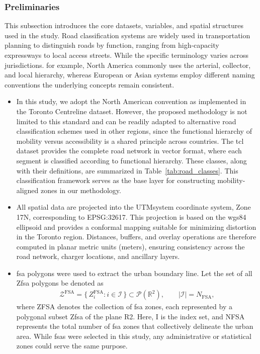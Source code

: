\subsubsection{Preliminaries}
This subsection introduces the core datasets, variables, and spatial structures
used in the study. Road classification systems are widely used in transportation planning to
distinguish roads by function, ranging from high-capacity expressways to
local access streets. While the specific terminology varies across
jurisdictions. for example, North America commonly uses the arterial, collector, and local hierarchy, whereas European or Asian systems employ different naming conventions the underlying concepts remain consistent. 
\begin{itemize}
\item In this study, we adopt the North American convention as implemented in
the Toronto Centreline dataset. However, the proposed methodology is not limited to this standard and can be readily adapted to alternative road classification schemes used in other regions, since the functional hierarchy of mobility versus accessibility is a shared principle across
countries. The \gls{tcl} dataset provides the complete road network in
vector format, where each segment is classified according to functional
hierarchy. These classes, along with their definitions, are summarized in
Table~\ref{tab:road_classes}. This classification framework serves as the
base layer for constructing mobility-aligned zones in our methodology.
    \item \label{def:projection}All spatial data are projected into the \gls{UTMsystem} coordinate
system, Zone 17N, corresponding to EPSG:32617. This projection is based on the \gls{wgs84}
ellipsoid and provides a conformal mapping suitable for minimizing distortion in the
Toronto region. Distances, buffers, and overlay operations are therefore computed in
planar metric units (meters), ensuring consistency across the road network, charger
locations, and ancillary layers.
 
\item \gls{fsa} polygons were used to extract the urban boundary line. Let the set of all \gls{Zfsa} polygons be denoted as  
\begin{align}
    \mathcal{Z}^{\mathrm{FSA}}
   = \{\, Z^{\mathrm{FSA}}_i : i \in \mathcal{I} \,\}
   \subset \mathcal{P}(\mathbb{R}^2),
\qquad |\mathcal{I}| = N_{\mathrm{FSA}},
\end{align}
where \gls{ZFSA} denotes the collection of \gls{fsa} zones, each represented by a polygonal subset \gls{Zfsa} of the plane \gls{R2}. 
Here, \gls{I} is the index set, and \gls{NFSA} represents the total number of \gls{fsa} zones that collectively delineate the urban area.
 While \glspl{fsa} were selected in this study, any administrative or statistical zones could serve the same purpose.


\end{itemize}
